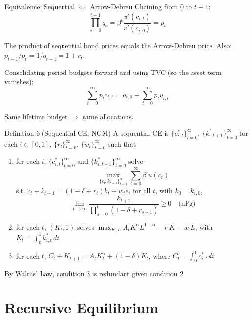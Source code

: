 \documentclass[blue]{beamer}
\begin{document}
\begin{frame}{Equivalence: Sequential $\Leftrightarrow$ Arrow-Debreu}
	Chaining from $0$ to $t-1$:
	\[
	\prod_{s=0}^{t-1} q_s = \beta^t \frac{u'(c_{i,t})}{u'(c_{i,0})} = p_t
	\]
	
	The product of sequential bond prices equals the Arrow-Debreu price. Also: $p_{t-1}/p_t = 1/q_{t-1} = 1 + r_t$.
	
	\bigskip
	Consolidating period budgets forward and using TVC (so the asset term vanishes):
	\[
	\sum_{t=0}^{\infty} p_t c_{i,t} = a_{i,0} + \sum_{t=0}^{\infty} p_t y_{i,t}
	\]
	
	Same lifetime budget $\Rightarrow$ same allocations.
\end{frame}

\begin{frame}{Definition 6 (Sequential CE, NGM)}
	\small
	A sequential CE is $\{c_{i,t}^*\}_{t=0}^{\infty}$, $\{k_{i,t+1}^*\}_{t=0}^{\infty}$ for each $i \in [0,1]$, $\{r_t\}_{t=0}^{\infty}$, $\{w_t\}_{t=0}^{\infty}$ such that
	
	\begin{enumerate}
		\item for each $i$, $\{c_{i,t}^*\}_{t=0}^{\infty}$ and $\{k_{i,t+1}^*\}_{t=0}^{\infty}$ solve
		\[
		\max_{\{c_t, k_{t+1}\}_{t=0}^{\infty}} \sum_{t=0}^{\infty} \beta^t u(c_t)
		\]
		s.t. $c_t + k_{t+1} = (1-\delta+r_t) k_t + w_t e_i$ for all $t$, with $k_0 = k_{i,0}$,
		\[
		\lim_{t \to \infty} \frac{k_{t+1}}{\prod_{s=0}^{t}(1-\delta+r_{s+1})} \geq 0 \quad \text{(nPg)}
		\]
		
		\item for each $t$, $(K_t, 1)$ solves $\max_{K,L} A_t K^{\alpha} L^{1-\alpha} - r_t K - w_t L$, with $K_t = \int_0^1 k_{i,t}^* \, di$
		
		\item for each $t$, $C_t + K_{t+1} = A_t K_t^{\alpha} + (1-\delta) K_t$, where $C_t = \int_0^1 c_{i,t}^* \, di$
	\end{enumerate}
	
	\normalsize
	\medskip
	By Walras' Law, condition 3 is redundant given condition 2
\end{frame}

\section{Recursive Equilibrium}
\end{document}
